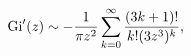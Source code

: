 \[\mathop{\mathrm{Gi}\/}\nolimits'\!\left(z\right)\sim-\frac{1}{\pi z^{2}}\sum_{%
k=0}^{\infty}\frac{(3k+1)!}{k!(3z^{3})^{k}},\]